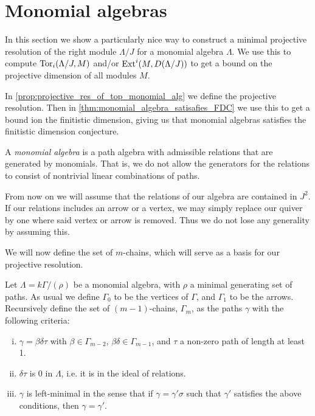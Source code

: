 \section{Monomial algebras}\label{sec:monomial_algebras}

In this section we show a particularly nice way to construct a minimal projective resolution of the right module $\Lambda / J$ for a monomial algebra $\Lambda$. We use this to compute $\operatorname{Tor}_i(\Lambda /J, M)$ and/or $\operatorname{Ext}^i(M, D(\Lambda/J))$ to get a bound on the projective dimension of all modules $M$.

In \cref{prop:projective_res_of_top_monomial_alg} we define the projective resolution. Then in \cref{thm:monomial_algebra_satisafies_FDC} we use this to get a bound ion the finitistic dimension, giving us that monomial algebras satisfies the finitistic dimension conjecture.

\begin{defn}
	A \emph{monomial algebra} is a path algebra with admissible relations that are generated by monomials. That is, we do not allow the generators for the relations to consist of nontrivial linear combinations of paths.
\end{defn}

From now on we will assume that the relations of our algebra are contained in $J^2$. If our relations includes an arrow or a vertex, we may simply replace our quiver by one where said vertex or arrow is removed. Thus we do not lose any generality by assuming this.

We will now define the set of $m$-chains, which will serve as a basis for our projective resolution.

\begin{defn}[$m$-chains]\cite{GKK91}
	Let $\Lambda = k\Gamma / (\rho)$ be a monomial algebra, with $\rho$ a minimal generating set of paths. As usual we define $\Gamma_0$ to be the vertices of $\Gamma$, and $\Gamma_1$ to be the arrows. Recursively define the set of $(m-1)$-chains, $\Gamma_m$, as the paths $\gamma$ with the following criteria:
	\begin{enumerate}[i)]
		\item $\gamma = \beta\delta\tau$ with $\beta \in \Gamma_{m-2}$, $\beta\delta \in \Gamma_{m-1}$, and $\tau$ a non-zero path of length at least 1.
		\item $\delta\tau$ is 0 in $\Lambda$, i.e. it is in the ideal of relations.
		\item $\gamma$ is left-minimal in the sense that if $\gamma = \gamma' \sigma$ such that $\gamma'$ satisfies the above conditions, then $\gamma = \gamma'$.
	\end{enumerate}
\end{defn}

